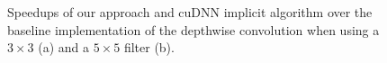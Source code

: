 \begin{figure}
\centering
	

\vspace{-2mm} \caption{Speedups of our approach and cuDNN implicit algorithm over the baseline implementation of the depthwise convolution when using a
$3\times 3$ (a) and a $5\times 5$ filter (b).} \label{fig:dwruntime}
\vspace{-2mm}
\end{figure}



